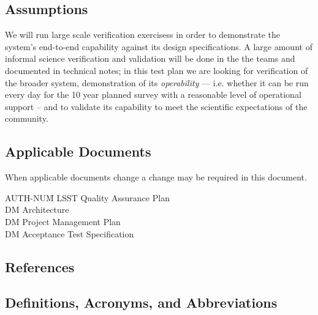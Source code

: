 \subsection{Assumptions}

We will run large scale verification exercisess in order to demonstrate the system's end-to-end capability against its design specifications.
A large amount of informal science verification and validation will be done in the the teams and documented in technical notes; in this test plan we are looking for verification of the broader system, demonstration of its \emph{operability} --- i.e. whether it can be run every day for the 10 year planned survey with a reasonable level of operational support --  and to validate its capability to meet the scientific expectations of the community.

\subsection{Applicable Documents \label{sect:ad}}

When applicable documents change a change may be required in this document.
\begin{tabbing}
AUTH-NUM\= \kill
{} \>	LSST Quality  Assurance Plan \\
 \>	DM Architecture\\
 \>	DM Project Management Plan   \\
 \>	DM Acceptance Test Specification \\
\end{tabbing}

\subsection{References}

\renewcommand{\refname}{}


\subsection{Definitions, Acronyms, and Abbreviations \label{sect:acronyms}}

